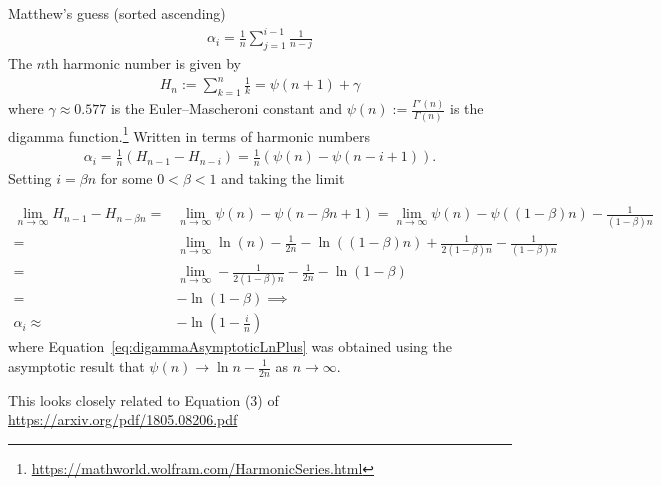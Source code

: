 Matthew's guess (sorted ascending)
\begin{align}
\alpha_i = \frac{1}{n} \sum_{j=1}^{i-1} \frac{1}{n-j}
\end{align}
The $n$th harmonic number is given by
\begin{align}
    H_n := \sum_{k=1}^n \frac{1}{k} = \psi(n+1) + \gamma
\end{align}
where $\gamma \approx 0.577$ is the Euler–Mascheroni constant and $\psi(n) := \frac{\Gamma'(n)}{\Gamma(n)}$ is the digamma function.\footnote{\url{https://mathworld.wolfram.com/HarmonicSeries.html}}
Written in terms of harmonic numbers
\begin{align}
    \alpha_i = \frac{1}{n} \left( H_{n-1} - H_{n-i} \right) = \frac{1}{n} \left( \psi(n) - \psi(n-i+1) \right).
\end{align}
Setting $i=\beta n$ for some $0<\beta<1$ and taking the limit
\iffalse
\begin{align}
    \lim_{n\rightarrow \infty} H_{n-1} - H_{n - \beta n} \approx& \lim_{n\rightarrow \infty} \ln (n-1) - \ln (1-\beta)n \\
    =& \lim_{n\rightarrow \infty} \ln (n-1) - \ln n - \ln (1-\beta) =  -\ln (1-\beta) \implies \\
    \alpha_i \approx& -\ln \left(1 - \frac{i}{n}\right)
\end{align}
\todo[inline]{Double check what we get if we derive the limit using the digamma function  in place of the logarithm.  The below derivation is technically more principled than above.}
\fi
\begin{align}
    \lim_{n\rightarrow \infty} H_{n-1} - H_{n-\beta n} =& \lim_{n\rightarrow \infty} \psi(n) - \psi(n-\beta n+1) = \lim_{n\rightarrow \infty} \psi(n) - \psi((1-\beta) n) - \frac{1}{(1-\beta) n} \\
    =& \lim_{n\rightarrow \infty} \ln(n) - \frac{1}{2n} - \ln((1-\beta) n) + \frac{1}{2(1-\beta)n} - \frac{1}{(1-\beta)n} \label{eq:digammaAsymptoticLnPlus} \\
    =& \lim_{n\rightarrow \infty}   - \frac{1}{2(1-\beta)n}  - \frac{1}{2n}  -\ln (1-\beta) \\
    =& -\ln (1-\beta) \implies \\
    \alpha_i \approx& -\ln \left(1 - \frac{i}{n}\right)
\end{align}
where Equation~\eqref{eq:digammaAsymptoticLnPlus} was obtained using the asymptotic result that $\psi(n) \rightarrow \ln n - \frac{1}{2n}$ as $n \rightarrow \infty$.

This looks closely related to Equation (3) of  \url{https://arxiv.org/pdf/1805.08206.pdf }


